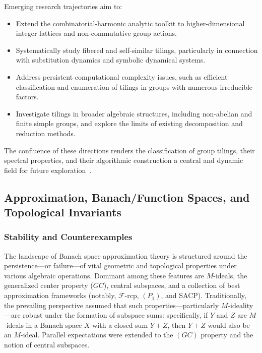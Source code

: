 Emerging research trajectories aim to:

\begin{itemize}
    \item Extend the combinatorial-harmonic analytic toolkit to higher-dimensional integer lattices and non-commutative group actions.
    \item Systematically study fibered and self-similar tilings, particularly in connection with substitution dynamics and symbolic dynamical systems.
    \item Address persistent computational complexity issues, such as efficient classification and enumeration of tilings in groups with numerous irreducible factors.
    \item Investigate tilings in broader algebraic structures, including non-abelian and finite simple groups, and explore the limits of existing decomposition and reduction methods.
\end{itemize}

The confluence of these directions renders the classification of group tilings, their spectral properties, and their algorithmic construction a central and dynamic field for future exploration~\cite{ref101}.

\subsection{Approximation, Banach/Function Spaces, and Topological Invariants}

\subsubsection{Stability and Counterexamples}

The landscape of Banach space approximation theory is structured around the persistence—or failure—of vital geometric and topological properties under various algebraic operations. Dominant among these features are $M$-ideals, the generalized center property ($GC$), central subspaces, and a collection of best approximation frameworks (notably, $\mathscr{F}$-rcp, $(P_1)$, and SACP). Traditionally, the prevailing perspective assumed that such properties—particularly $M$-ideality—are robust under the formation of subspace sums: specifically, if $Y$ and $Z$ are $M$-ideals in a Banach space $X$ with a closed sum $Y + Z$, then $Y + Z$ would also be an $M$-ideal. Parallel expectations were extended to the $(GC)$ property and the notion of central subspaces.

